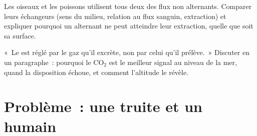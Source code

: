 \begin{exercise}[$\star\star\star$]\label{exo:b1:gas-exchange:11}
Les oiseaux et les poissons utilisent tous deux des flux non
alternants. Comparer leurs échangeurs (sens du milieu, relation au
flux sanguin, extraction) et expliquer pourquoi un  alternant ne
peut atteindre leur extraction, quelle que soit sa surface.
\end{exercise}

\begin{exercise}[$\star\star\star$]\label{exo:b1:gas-exchange:12}
«~Le  est réglé par le gaz qu'il excrète, non par celui qu'il
prélève.~» Discuter en un paragraphe~: pourquoi le $\mathrm{CO_2}$ est le
meilleur signal au niveau de la mer, quand la disposition échoue, et
comment l'altitude le révèle.
\end{exercise}

\section{Problème~: une truite et un humain}

